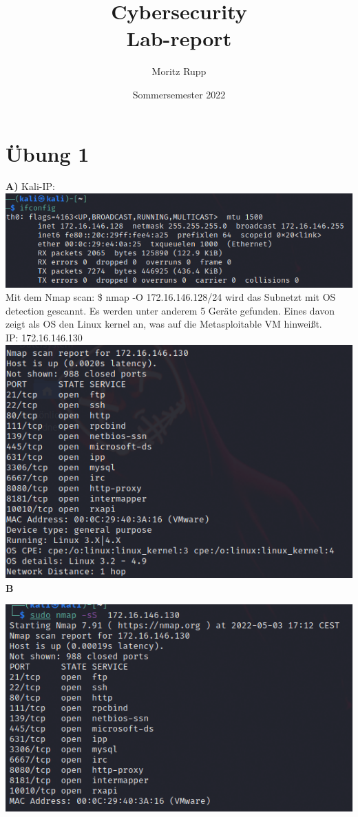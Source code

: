 \documentclass[a4paper,10pt]{article}
\title{Cybersecurity\\
	Lab-report
}
\author{Moritz Rupp}
\date{Sommersemester 2022}
\begin{document}
\maketitle
\newpage
\tableofcontents
\newpage
\section{Übung 1}
\textbf{A)}
Kali-IP:\\
\includegraphics[scale=0.5]{kaliip.png}
\vspace{5mm}\\
\noindent Mit dem Nmap scan: \$ nmap -O 172.16.146.128/24 wird das Subnetzt mit OS detection gescannt.  Es werden unter anderem 5 Geräte gefunden. Eines davon zeigt als OS den Linux kernel an, was auf die Metasploitable VM hinweißt.\\
IP: 172.16.146.130\\
\includegraphics[scale=0.5]{nmapscan.png}\\
\textbf{B}

\noindent \includegraphics[scale=0.5]{nmapmeta.png}\\
\end{document}
